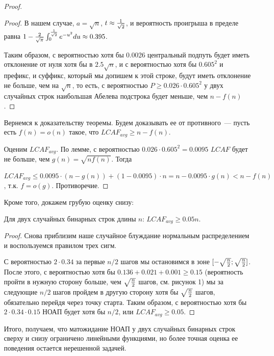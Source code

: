 \begin{proof}
\begin{proof}
В нашем случае, $a=\sqrt n$, $t \approx {1 \over \sqrt 2}$, и вероятность проигрыша в пределе равна $1 - {2 \over \sqrt \pi} \int_0^{1 \over \sqrt 2} e^{-u^2} du \approx 0.395$.

Таким образом, с вероятностью хотя бы 0.0026 центральный подпуть будет иметь отклонение от нуля хотя бы в $2.5\sqrt n$, и с вероятностью хотя бы $0.605^2$ и префикс, и суффикс, который мы допишем к этой строке, будут иметь отклонение не больше, чем на $\sqrt n$, то есть, с вероятностью $P \ge 0.026 \cdot 0.605^2$ у двух случайных строк наибольшая Абелева подстрока будет меньше, чем $n-f(n)$.

\end{proof}

Вернемся к доказательству теоремы. Будем доказывать ее от противного~--- пусть есть $f(n)=o(n)$ такое, что $LCAF_{avg} \ge n - f(n)$. 

Оценим $LCAF_{avg}$. По лемме, с вероятностью $0.026 \cdot 0.605^2 = 0.0095$ $LCAF$ будет не больше, чем $g(n)=\sqrt{nf(n)}$. Тогда

$LCAF_{avg} \le 0.0095 \cdot (n-g(n)) + (1-0.0095)\cdot n = n-0.0095\cdot g(n) < n - f(n)$, т.к. $f=o(g)$. Противоречие.

\end{proof}

Кроме того, докажем грубую оценку снизу:
\begin{theorem}
Для двух случайных бинарных строк длины $n$: $LCAF_{avg} \ge 0.05n$.
\end{theorem}
\begin{proof}
Снова приблизим наше случайное блуждание нормальным распределением и воспользуемся правилом трех сигм.

С вероятностью $2 \cdot 0.34$ за первые $n/2$ шагов мы остановимся в зоне $[-\sqrt{n \over 2}; \sqrt{n \over 2}]$. После этого, с вероятностью хотя бы $0.136+0.021+0.001 \ge 0.15$ (вероятность пройти в нужную сторону больше, чем $\sqrt{n \over 2}$ шагов, см. рисунок 1) мы за следующие $n/2$ шагов пройдем в другую сторону хотя бы $\sqrt{n \over 2}$ шагов, обязательно перейдя через точку старта. Таким образом, с вероятностью хотя бы $2 \cdot 0.34 \cdot 0.15$ НОАП будет хотя бы $n/2$, или $LCAF_{avg} \ge 0.05$. %

\end{proof}

Итого, получаем, что матожидание НОАП у двух случайных бинарных строк сверху и снизу ограничено линейными функциями, но более точная оценка ее поведения остается нерешенной задачей.

